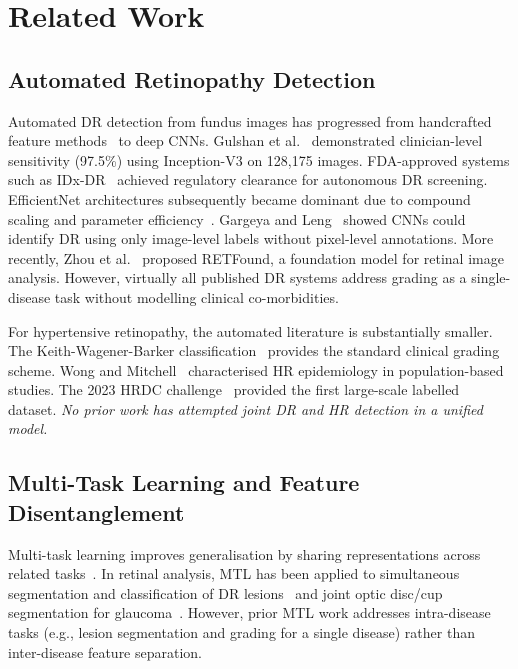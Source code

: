 \documentclass[conference]{IEEEtran}
\begin{document}
\section{Related Work}

\subsection{Automated Retinopathy Detection}

Automated DR detection from fundus images has progressed from handcrafted feature methods~\cite{niemeijer2010} to deep CNNs. Gulshan et al.~\cite{gulshan2016} demonstrated clinician-level sensitivity (97.5\%) using Inception-V3 on 128,175 images. FDA-approved systems such as IDx-DR~\cite{abramoff2018} achieved regulatory clearance for autonomous DR screening. EfficientNet architectures subsequently became dominant due to compound scaling and parameter efficiency~\cite{tan2019}. Gargeya and Leng~\cite{gargeya2017} showed CNNs could identify DR using only image-level labels without pixel-level annotations. More recently, Zhou et al.~\cite{zhou2023} proposed RETFound, a foundation model for retinal image analysis. However, virtually all published DR systems address grading as a single-disease task without modelling clinical co-morbidities.

For hypertensive retinopathy, the automated literature is substantially smaller. The Keith-Wagener-Barker classification~\cite{kwb1939} provides the standard clinical grading scheme. Wong and Mitchell~\cite{wong2004} characterised HR epidemiology in population-based studies. The 2023 HRDC challenge~\cite{hrdc2023} provided the first large-scale labelled dataset. \textit{No prior work has attempted joint DR and HR detection in a unified model.}

\subsection{Multi-Task Learning and Feature Disentanglement}

Multi-task learning improves generalisation by sharing representations across related tasks~\cite{crawshaw2020}. In retinal analysis, MTL has been applied to simultaneous segmentation and classification of DR lesions~\cite{li2019} and joint optic disc/cup segmentation for glaucoma~\cite{fu2018}. However, prior MTL work addresses intra-disease tasks (e.g., lesion segmentation and grading for a single disease) rather than inter-disease feature separation.
\end{document}
